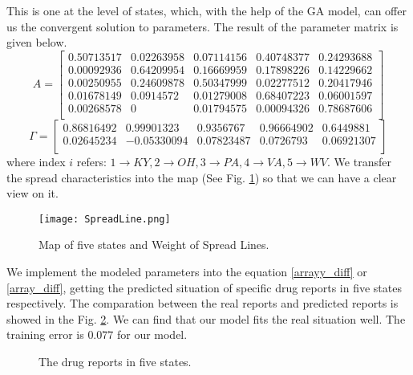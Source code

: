 This is one at the level of states, which, with the help of the GA model, can offer us the convergent solution to parameters. The result of the parameter matrix is given below.
\begin{equation}
A=\left[ \begin{matrix}
	0.50713517&		0.02263958&		0.07114156&		0.40748377&		0.24293688\\
	0.00092936&		0.64209954&		0.16669959&		0.17898226&		0.14229662\\
	0.00250955&		0.24609878&		0.50347999&		0.02277512&		0.20417946\\
	0.01678149&		0.0914572&		0.01279008&		0.68407223&		0.06001597\\
	0.00268578&		0&		0.01794575&		0.00094326&		0.78687606\\
\end{matrix} \right] 
\end{equation}
\begin{equation}
\varGamma =\left[ \begin{matrix}
	0.86816492&		0.99901323&		0.9356767&		0.96664902&		0.6449881\\
	0.02645234&		-0.05330094&		0.07823487&		0.0726793&		0.06921307\\
\end{matrix} \right] 
\end{equation}
where index $i$ refers: $1\rightarrow KY, 2\rightarrow OH, 3\rightarrow PA, 4\rightarrow VA, 5\rightarrow WV$. We transfer the spread characteristics into the map (See Fig. \ref{SpreadLine}) so that we can have a clear view on it.
\begin{figure}
	\centering
	\texttt{[image: SpreadLine.png]}
	\caption{Map of five states and Weight of Spread Lines.}
	\label{SpreadLine}
\end{figure}

We implement the modeled parameters into the equation \ref{arrayy_diff} or \ref{array_diff}, getting the predicted situation of specific drug reports in five states respectively. The comparation between the real reports and predicted reports is showed in the Fig. \ref{drug_five}. We can find that our model fits the real situation well. The training error is $0.077$ for our model.

\begin{figure}[htbp]
\centering
{}
\quad
{}
\quad
{}
\quad
{}
\quad
{}
\caption{The drug reports in five states.}\label{drug_five}
\end{figure}

